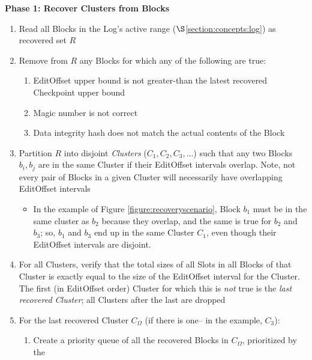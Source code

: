 \documentclass[11pt]{article}
\begin{document}
\textbf{Phase 1: Recover Clusters from Blocks}

\begin{enumerate}
	\item Read all Blocks in the Log's active range
          ($\S$\ref{section:concepts:log}) as recovered set $R$
	\item Remove from $R$ any Blocks for which any of the following are true:
	\begin{enumerate}
		\item EditOffset upper bound is not greater-than the
                  latest recovered Checkpoint upper bound
		\item Magic number is not correct
		\item Data integrity hash does not match the actual
                  contents of the Block
	\end{enumerate}
	\item Partition $R$ into disjoint \textit{Clusters} ($C_1,
          C_2, C_3, ...$) such that any two Blocks $b_i, b_j$ are in
          the same Cluster if their EditOffset intervals overlap.
          Note, not every pair of Blocks in a given Cluster will
          necessarily have overlapping EditOffset intervals
		\begin{itemize}
		    \item[] In the example of Figure
                      \ref{figure:recoveryscenario}, Block $b_1$ must
                      be in the same cluster as $b_2$ because they
                      overlap, and the same is true for $b_2$ and
                      $b_3$; so, $b_1$ and $b_3$ end up in the same
                      Cluster $C_1$, even though their EditOffset
                      intervals are disjoint.
		\end{itemize}
	\item For all Clusters, verify that the total sizes of all
          Slots in all Blocks of that Cluster is exactly equal to the
          size of the EditOffset interval for the Cluster.  The first
          (in EditOffset order) Cluster for which this is \textit{not}
          true is the \textit{last recovered Cluster}; all Clusters
          after the last are dropped
	\item For the last recovered Cluster $C_{\Omega}$ (if there is
          one-- in the example, $C_3$):
	\begin{enumerate}
		\item Create a priority queue of all the recovered
                  Blocks in $C_{\Omega}$, prioritized by the

\end{enumerate}
\end{enumerate}
\end{document}

